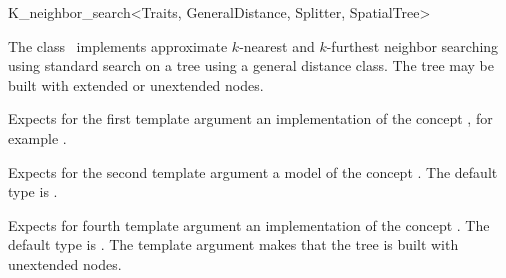 

\begin{ccRefClass}{K_neighbor_search<Traits, GeneralDistance, Splitter, SpatialTree>} 


\ccDefinition
  
The class \ccRefName\ implements approximate $k$-nearest and $k$-furthest neighbor searching
using standard search on a tree using a general distance class. The tree may be built with 
extended or unextended nodes.


\ccParameters

Expects for the first template argument an implementation of the concept ,
for example .

Expects for the second template argument a model of the
concept . The default type is 
.


Expects for fourth template argument an implementation of the concept .
The default type is . The 
template argument  makes that the tree is built with unextended nodes.

\ccTypes







\end{ccRefClass}
